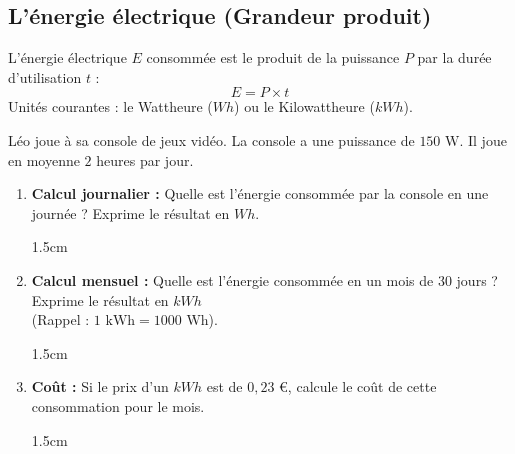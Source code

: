 \documentclass[a4paper]{book}
\begin{document}
    \vspace{0.8cm}
    
\subsection{L'énergie électrique (Grandeur produit)}
    
    \begin{definition}
        L'énergie électrique $E$ consommée est le produit de la puissance $P$ par la durée d'utilisation $t$ :
        \[ E = P \times t \]
        Unités courantes : le Wattheure ($Wh$) ou le Kilowattheure ($kWh$).
    \end{definition}
    
    
    \begin{exemple}
        Léo joue à sa console de jeux vidéo. La console a une puissance de $150 \text{ W}$. Il joue en moyenne $2$ heures par jour.
        
        \begin{enumerate}[leftmargin=*]
            \item \textbf{Calcul journalier :} Quelle est l'énergie consommée par la console en une journée ? Exprime le résultat en $Wh$.

            \begin{ZoneReponse}{1.5cm}
            \end{ZoneReponse}
            
            \item \textbf{Calcul mensuel :} Quelle est l'énergie consommée en un mois de 30 jours ? Exprime le résultat en $kWh$ \\
            (Rappel : $1 \text{ kWh} = 1000 \text{ Wh}$).

            \begin{ZoneReponse}{1.5cm}
            \end{ZoneReponse}
            
            \item \textbf{Coût :} Si le prix d'un $kWh$ est de $0,23$ €, calcule le coût de cette consommation pour le mois.

            \begin{ZoneReponse}{1.5cm}
            \end{ZoneReponse}
        \end{enumerate}
    \end{exemple}

    
\end{document}
